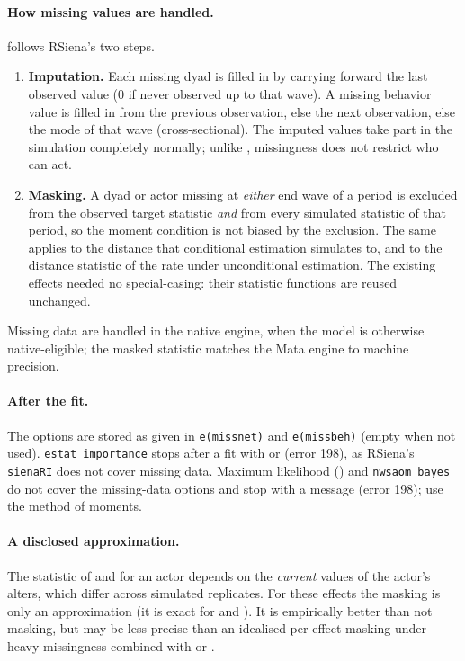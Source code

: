 \paragraph{How missing values are handled.} \nwsaom{} follows RSiena's two steps.
\begin{enumerate}
\item \textbf{Imputation.} Each missing dyad is filled in by carrying forward the last observed value (0 if never observed up to that wave). A missing behavior value is filled in from the previous observation, else the next observation, else the mode of that wave (cross-sectional). The imputed values take part in the simulation completely normally; unlike , missingness does not restrict who can act.
\item \textbf{Masking.} A dyad or actor missing at \emph{either} end wave of a period is excluded from the observed target statistic \emph{and} from every simulated statistic of that period, so the moment condition is not biased by the exclusion. The same applies to the distance that conditional estimation simulates to, and to the distance statistic of the rate under unconditional estimation. The existing effects needed no special-casing: their statistic functions are reused unchanged.
\end{enumerate}
Missing data are handled in the native engine, when the model is otherwise native-eligible; the masked statistic matches the Mata engine to machine precision.

\paragraph{After the fit.} The options are stored as given in \texttt{e(missnet)} and \texttt{e(missbeh)} (empty when not used). \texttt{estat importance} stops after a fit with  or  (error 198), as RSiena's \texttt{sienaRI} does not cover missing data. Maximum likelihood () and \texttt{nwsaom bayes} do not cover the missing-data options and stop with a message (error 198); use the method of moments.

\paragraph{A disclosed approximation.} The statistic of  and  for an actor depends on the \emph{current} values of the actor's alters, which differ across simulated replicates. For these effects the masking is only an approximation (it is exact for  and ). It is empirically better than not masking, but may be less precise than an idealised per-effect masking under heavy missingness combined with  or .


